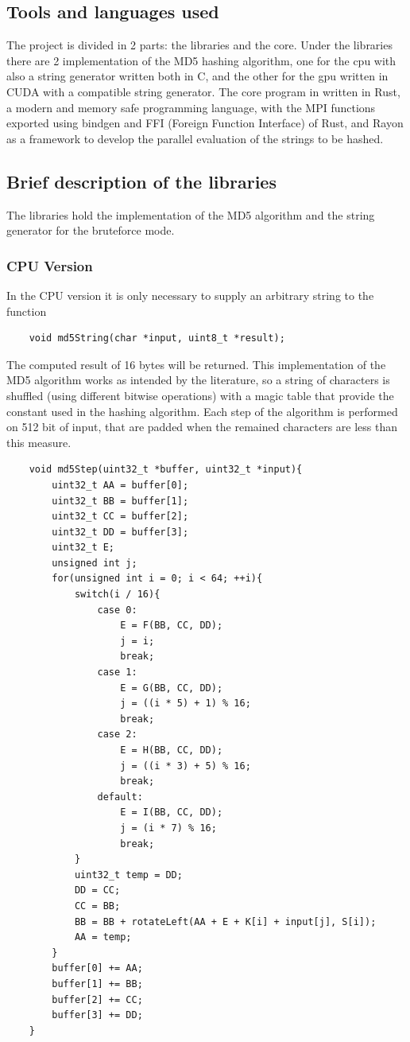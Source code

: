 \documentclass[12pt,a4paper]{article}
\begin{document}
\subsection{Tools and languages used}
The project is divided in 2 parts: the libraries and the core. Under the libraries there are 2 implementation of the MD5 hashing algorithm, one for the cpu with also a string generator written both in C,  and the other for the gpu written in CUDA with a compatible string generator. The core program in written in Rust, a modern and memory safe programming language, with the MPI functions exported using bindgen and FFI (Foreign Function Interface) of Rust, and Rayon as a framework to develop the parallel evaluation of the strings to be hashed.


\subsection{Brief description of the libraries}
The libraries hold the implementation of the MD5 algorithm and the string generator for the bruteforce mode.

\subsubsection{CPU Version}
In the CPU version it is only necessary to supply an arbitrary string to the function 
\begin{lstlisting}
    void md5String(char *input, uint8_t *result);
\end{lstlisting}

The computed result of 16 bytes will be returned. This implementation of the MD5 algorithm works as intended by the literature, so a string of characters is shuffled (using different bitwise operations) with a magic table that provide the constant used in the hashing algorithm. Each step of the algorithm is performed on 512 bit of input, that are padded when the remained characters are less than this measure.

\begin{lstlisting}
    void md5Step(uint32_t *buffer, uint32_t *input){
        uint32_t AA = buffer[0];
        uint32_t BB = buffer[1];
        uint32_t CC = buffer[2];
        uint32_t DD = buffer[3];
        uint32_t E;
        unsigned int j;
        for(unsigned int i = 0; i < 64; ++i){
            switch(i / 16){
                case 0:
                    E = F(BB, CC, DD);
                    j = i;
                    break;
                case 1:
                    E = G(BB, CC, DD);
                    j = ((i * 5) + 1) % 16;
                    break;
                case 2:
                    E = H(BB, CC, DD);
                    j = ((i * 3) + 5) % 16;
                    break;
                default:
                    E = I(BB, CC, DD);
                    j = (i * 7) % 16;
                    break;
            }
            uint32_t temp = DD;
            DD = CC;
            CC = BB;
            BB = BB + rotateLeft(AA + E + K[i] + input[j], S[i]);
            AA = temp;
        }
        buffer[0] += AA;
        buffer[1] += BB;
        buffer[2] += CC;
        buffer[3] += DD;
    }
\end{lstlisting}
\end{document}
